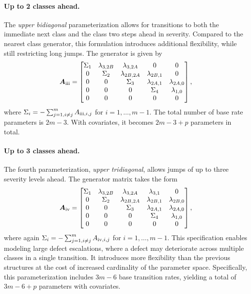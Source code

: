 \documentclass{article}
\newcommand{\myparagraph}[1]{\paragraph{#1}\mbox{}\\}
\newcommand{\RN}[1]{\textup{\uppercase\expandafter{\romannumeral#1}}}
\providecommand{\DIFadd}[1]{{\protect\color{blue} \sf #1}} %
\providecommand{\DIFaddbegin}{} %
\providecommand{\DIFaddend}{} %
\providecommand{\DIFdelbegin}{} %
\providecommand{\DIFdelend}{} %
\begin{document}
\DIFdelbegin %
\DIFdelend \DIFaddbegin \paragraph{\DIFadd{Up to 2 classes ahead.}}
\DIFaddend The \textit{upper bidiagonal} parameterization allows for transitions to both the immediate next class and the class two steps ahead in severity. Compared to the nearest class generator, this formulation introduces additional flexibility, while still restricting long jumps. The generator is given by
\begin{align}
\bm{A}_{\RN{3}} = \begin{bmatrix}
\Sigma_1 & \lambda_{3,2B} & \lambda_{3,2A} & 0 & 0 \\
0 & \Sigma_2 & \lambda_{2B,2A} & \lambda_{2B,1} & 0 \\
0 & 0 & \Sigma_3 & \lambda_{2A,1} & \lambda_{2A,0} \\
0 & 0 & 0 & \Sigma_4 & \lambda_{1,0} \\
0 & 0 & 0 & 0 & 0 \\
\end{bmatrix}, \label{eq:generator_bidiagonal}
\end{align}
where $\Sigma_i = -\sum_{j=1, i \neq j}^m A_{\RN{3},i,j}$ for $i = 1, \dots, m-1$.
The total number of base rate parameters is $2m - 3$. With covariates, it becomes $2m - 3 + p$ parameters in total.

\DIFdelbegin %
\DIFdelend \DIFaddbegin \paragraph{\DIFadd{Up to 3 classes ahead.}}
\DIFaddend The fourth parameterization, \textit{upper tridiagonal}, allows jumps of up to three severity levels ahead. The generator matrix takes the form
\begin{align}
\bm{A}_{\RN{4}}= \begin{bmatrix}
\Sigma_1 & \lambda_{3,2B} & \lambda_{3,2A} & \lambda_{3,1} & 0 \\
0 & \Sigma_2 & \lambda_{2B,2A} & \lambda_{2B,1} & \lambda_{2B,0} \\
0 & 0 & \Sigma_3 & \lambda_{2A,1} & \lambda_{2A,0} \\
0 & 0 & 0 & \Sigma_4 & \lambda_{1,0} \\
0 & 0 & 0 & 0 & 0 \\
\end{bmatrix}, \label{eq:generator_tridiagonal}
\end{align}
where again $\Sigma_i = -\sum_{j=1, i \neq j}^m A_{\RN{4},i,j}$ for $i = 1, \dots, m-1$.
This specification enables modeling large defect escalations, where a defect may deteriorate across multiple classes in a single transition. It introduces more flexibility than the previous structures at the cost of increased cardinality of the parameter space. Specifically, this parameterization includes $3m - 6$ base transition rates, yielding a total of $3m - 6 + p$ parameters with covariates.
\end{document}

